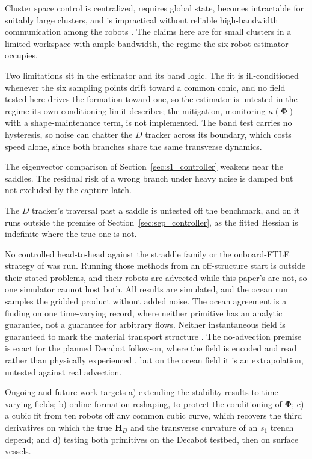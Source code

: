 \documentclass[lettersize,journal]{IEEEtran}
\begin{document}
Cluster space control is centralized, requires global state, becomes intractable
for suitably large clusters, and is impractical without reliable
high-bandwidth communication among the robots \cite{30}. The claims here
are for small clusters in a limited workspace with ample bandwidth, the
regime the six-robot estimator occupies.

Two limitations sit in the estimator and its band logic. The fit is
ill-conditioned whenever the six sampling points drift toward a common
conic, and no field tested here drives the formation toward one, so the
estimator is untested in the regime its own conditioning limit
describes; the mitigation, monitoring $\kappa(\boldsymbol{\Phi})$ with a
shape-maintenance term, is not implemented. The band test carries no
hysteresis, so noise can chatter the $D$ tracker across its boundary,
which costs speed alone, since both branches share the same transverse
dynamics.

The eigenvector comparison of
Section~\ref{sec:s1_controller} weakens near the saddles. The residual risk
of a wrong branch under heavy noise is damped but not excluded by the
capture latch.

The $D$ tracker's traversal past a saddle is untested off the benchmark,
and on it runs outside the premise of
Section~\ref{sec:sep_controller}, as the fitted Hessian is
indefinite where the true one is not.

No controlled head-to-head against the straddle family \cite{26,27,28} or the onboard-FTLE strategy of \cite{29} was run. Running those methods from an off-structure start is outside their stated problems, and their robots are advected while this paper's are not, so one simulator cannot host both.
All results are simulated, and the ocean run samples the gridded product without added noise. The ocean agreement is a finding on one time-varying record, where
neither primitive has an analytic guarantee, not a guarantee for arbitrary
flows. Neither instantaneous field is guaranteed to mark the material
transport structure \cite{18}. The no-advection premise is exact for the
planned Decabot follow-on, where the field is encoded and read rather
than physically experienced \cite{32}, but on the ocean field it is an
extrapolation, untested against real advection.

Ongoing and future work targets a) extending the stability results to
time-varying fields; b) online formation reshaping, to protect the
conditioning of $\boldsymbol{\Phi}$; c) a cubic fit from ten robots off any common cubic curve, which
recovers the third derivatives on which the true $\mathbf{H}_D$ and the
transverse curvature of an $s_1$ trench depend; and d) testing both primitives on the Decabot testbed, then on surface vessels.
\end{document}
